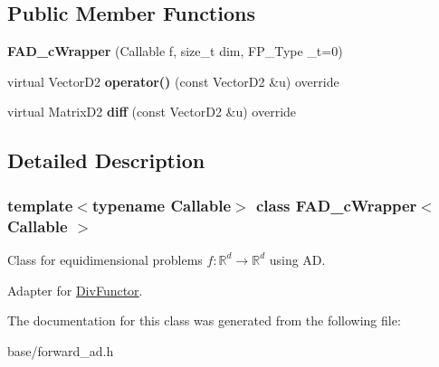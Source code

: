 \subsection*{Public Member Functions}
\begin{DoxyCompactItemize}
\item 
\mbox{\label{classFAD__cWrapper_aac4ca71e136e781b51d5a0b21c4da73c}} 
{\bfseries F\+A\+D\+\_\+c\+Wrapper} (Callable f, size\+\_\+t dim, F\+P\+\_\+\+Type \+\_\+t=0)
\item 
\mbox{\label{classFAD__cWrapper_a866172a2028651446996452096b2cb24}} 
virtual Vector\+D2 {\bfseries operator()} (const Vector\+D2 \&u) override
\item 
\mbox{\label{classFAD__cWrapper_aba8e02646b286f26ce68c101dc3fe771}} 
virtual Matrix\+D2 {\bfseries diff} (const Vector\+D2 \&u) override
\end{DoxyCompactItemize}


\subsection{Detailed Description}
\subsubsection*{template$<$typename Callable$>$\newline
class F\+A\+D\+\_\+c\+Wrapper$<$ Callable $>$}

Class for equidimensional problems $f:\mathbb{R}^d \rightarrow \mathbb{R}^d$ using AD. 

Adapter for {\ttfamily \hyperlink{classDivFunctor}{Div\+Functor}}. 

The documentation for this class was generated from the following file\+:\begin{DoxyCompactItemize}
\item 
base/forward\+\_\+ad.\+h\end{DoxyCompactItemize}
